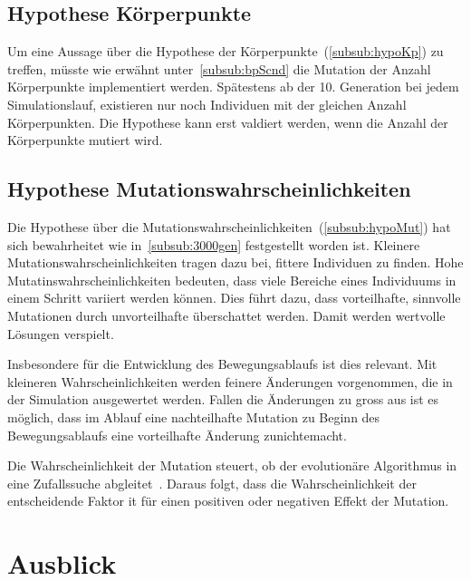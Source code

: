     \subsection{Hypothese Körperpunkte\label{sub:PerspectiveHypBodyPoints}}

      Um eine Aussage über die Hypothese der Körperpunkte~(\vref{subsub:hypoKp}) zu treffen,
      müsste wie erwähnt unter~\vref{subsub:bpScnd} die Mutation der Anzahl Körperpunkte implementiert werden.
      Spätestens ab der 10. Generation bei jedem Simulationslauf,
      existieren nur noch Individuen mit der gleichen Anzahl Körperpunkten.
      Die Hypothese kann erst valdiert werden, wenn die Anzahl der Körperpunkte mutiert wird.

    \subsection{Hypothese Mutationswahrscheinlichkeiten}

      Die Hypothese über die Mutationswahrscheinlichkeiten~(\vref{subsub:hypoMut}) hat sich bewahrheitet
      wie in~\vref{subsub:3000gen} festgestellt worden ist.
      Kleinere Mutationswahrscheinlichkeiten tragen dazu bei, fittere Individuen zu finden.
      Hohe Mutatinswahrscheinlichkeiten bedeuten,
      dass viele Bereiche eines Individuums in einem Schritt variiert werden können.
      Dies führt dazu, dass vorteilhafte, sinnvolle Mutationen durch unvorteilhafte überschattet werden.
      Damit werden wertvolle Lösungen verspielt.

      \smallskip

      Insbesondere für die Entwicklung des Bewegungsablaufs ist dies relevant.
      Mit kleineren Wahrscheinlichkeiten werden feinere Änderungen vorgenommen,
      die in der Simulation ausgewertet werden.
      Fallen die Änderungen zu gross aus ist es möglich, dass im Ablauf eine nachteilhafte Mutation
      zu Beginn des Bewegungsablaufs eine vorteilhafte Änderung zunichtemacht.

      \smallskip

      Die Wahrscheinlichkeit der Mutation steuert,
      ob der evolutionäre Algorithmus in eine Zufallssuche abgleitet~\cite{Sampson1976}.
      Daraus folgt, dass die Wahrscheinlichkeit der entscheidende Faktor it für einen positiven oder
      negativen Effekt der Mutation.

  \section{Ausblick\label{sec:ausblick}}

